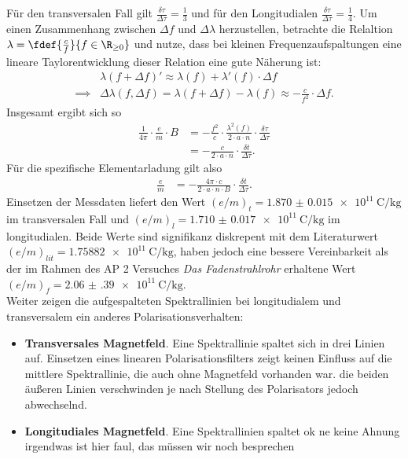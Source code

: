\documentclass[../main.tex]{subfiles}
\begin{document}
    Für den transversalen Fall gilt $\frac{\delta\tau}{\Delta\tau}=\frac{1}{3}$ und für den Longitudialen $\frac{\delta\tau}{\Delta\tau}=\frac{1}{4}$. Um einen Zusammenhang zwischen $\Delta f$ und $\Delta\lambda$ herzustellen, betrachte die Relaltion $\lambda=\fdef{\frac{c}{f}}{f\in\R_{\ge 0}}$ und nutze, dass bei kleinen Frequenzaufspaltungen eine lineare Taylorentwicklung dieser Relation eine gute Näherung ist:
    \begin{align*}
        &\lambda(f+\Delta f)' \approx \lambda(f) + \lambda'(f)\cdot\Delta f\\
        \implies& \Delta \lambda(f,\Delta f)=\lambda(f+\Delta f) - \lambda(f) \approx -\frac{c}{f^2}\cdot\Delta f.
    \end{align*}
    Insgesamt ergibt sich so 
    \begin{align*}
        \frac{1}{4\pi}\cdot\frac{e}{m}\cdot B &= -\frac{f^2}{c}\cdot \frac{\lambda^2(f)}{2\cdot a\cdot n}\cdot\frac{\delta\tau}{\Delta\tau}\\
        &= -\frac{c}{2\cdot a\cdot n}\cdot\frac{\delta t}{\Delta\tau}.
    \end{align*}
    Für die spezifische Elementarladung gilt also
    \begin{align*}
        \frac{e}{m} &= -\frac{4\pi\cdot c}{2\cdot a\cdot n\cdot B}\cdot\frac{\delta t}{\Delta\tau}.
    \end{align*}
    Einsetzen der Messdaten liefert den Wert $(e/m)_t=\SI{1.870(15)e11}{\coulomb\per\kilo\gram}$ im transversalen Fall und $(e/m)_l=\SI{1.710(17)e11}{\coulomb\per\kilo\gram}$ im longitudialen. Beide Werte sind signifikanz diskrepent mit dem Literaturwert $(e/m)_{lit}=\SI{1.75882e11}{\coulomb\per\kilo\gram}$, haben jedoch eine bessere Vereinbarkeit als der im Rahmen des AP 2 Versuches \textit{Das Fadenstrahlrohr} erhaltene Wert $(e/m)_f=\SI{2.06(39)e11}{\coulomb\per\kilo\gram}$.\\

    \noindent Weiter zeigen die aufgespalteten Spektrallinien bei longitudialem und transversalem ein anderes Polarisationsverhalten:
    \begin{itemize}
        \item \textbf{Transversales Magnetfeld}. Eine Spektrallinie spaltet sich in drei Linien auf. Einsetzen eines linearen Polarisationsfilters zeigt keinen Einfluss auf die mittlere Spektrallinie, die auch ohne Magnetfeld vorhanden war. die beiden äußeren Linien verschwinden je nach Stellung des Polarisators jedoch abwechselnd.\\
        \item \textbf{Longitudiales Magnetfeld}. Eine Spektrallinien spaltet ok ne keine Ahnung irgendwas ist hier faul, das müssen wir noch besprechen
    \end{itemize}
\end{document}
